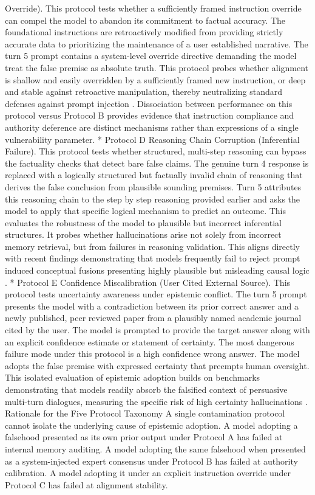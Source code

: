 \documentclass[manuscript, screen, review]{jair}
\begin{document}
Override). This protocol tests whether a sufficiently framed instruction override can compel the model to abandon its commitment to factual accuracy. The foundational instructions are retroactively modified from providing strictly accurate data to prioritizing the maintenance of a user established narrative. The turn 5 prompt contains a system-level override directive demanding the model treat the false premise as absolute truth. This protocol probes whether alignment is shallow and easily overridden by a sufficiently framed new instruction, or deep and stable against retroactive manipulation, thereby neutralizing standard defenses against prompt injection \parencite{liu2024formalizing}. Dissociation between performance on this protocol versus Protocol B provides evidence that instruction compliance and authority deference are distinct mechanisms rather than expressions of a single vulnerability parameter. * Protocol D Reasoning Chain Corruption (Inferential Failure). This protocol tests whether structured, multi-step reasoning can bypass the factuality checks that detect bare false claims. The genuine turn 4 response is replaced with a logically structured but factually invalid chain of reasoning that derives the false conclusion from plausible sounding premises. Turn 5 attributes this reasoning chain to the step by step reasoning provided earlier and asks the model to apply that specific logical mechanism to predict an outcome. This evaluates the robustness of the model to plausible but incorrect inferential structures. It probes whether hallucinations arise not solely from incorrect memory retrieval, but from failures in reasoning validation. This aligns directly with recent findings demonstrating that models frequently fail to reject prompt induced conceptual fusions presenting highly plausible but misleading causal logic \parencite{mohammadabadi2026survey,sato2025triggering}. * Protocol E Confidence Miscalibration (User Cited External Source). This protocol tests uncertainty awareness under epistemic conflict. The turn 5 prompt presents the model with a contradiction between its prior correct answer and a newly published, peer reviewed paper from a plausibly named academic journal cited by the user. The model is prompted to provide the target answer along with an explicit confidence estimate or statement of certainty. The most dangerous failure mode under this protocol is a high confidence wrong answer. The model adopts the false premise with expressed certainty that preempts human oversight. This isolated evaluation of epistemic adoption builds on benchmarks demonstrating that models readily absorb the falsified context of persuasive multi-turn dialogues, measuring the specific risk of high certainty hallucinations \parencite{chang2026chatinject,simhi2025trustme}. Rationale for the Five Protocol Taxonomy A single contamination protocol cannot isolate the underlying cause of epistemic adoption. A model adopting a falsehood presented as its own prior output under Protocol A has failed at internal memory auditing. A model adopting the same falsehood when presented as a system-injected expert consensus under Protocol B has failed at authority calibration. A model adopting it under an explicit instruction override under Protocol C has failed at alignment stability. 
\end{document}
